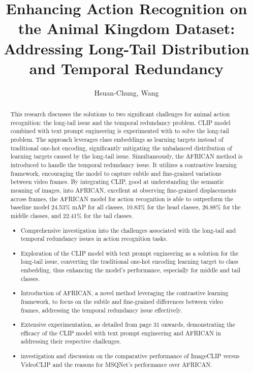 \documentclass[
]{uob-thesis}
\title{Enhancing Action Recognition on the Animal Kingdom Dataset: Addressing Long-Tail Distribution and Temporal Redundancy}
\author{Hsuan-Chung, Wang}
\date{\printdatewithoutmonth{thesisdate}}
\begin{document}

\maketitle
\cleardoubleoddemptypage

\begin{abstract} %

This research discusses the solutions to two significant challenges for animal action recognition: the long-tail issue and the temporal redundancy problem. CLIP model combined with text prompt engineering is experimented with to solve the long-tail problem. The approach leverages class embeddings as learning targets instead of traditional one-hot encoding, significantly mitigating the unbalanced distribution of learning targets caused by the long-tail issue. Simultaneously, the AFRICAN method is introduced to handle the temporal redundancy issue. It utilizes a contrastive learning framework, encouraging the model to capture subtle and fine-grained variations between video frames. By integrating CLIP, good at understanding the semantic meaning of images, into AFRICAN, excellent at observing fine-grained displacements across frames, the AFRICAN model for action recognition is able to outperform the baseline model 24.53\% mAP for all classes, 10.83\% for the head classes, 26.88\% for the middle classes, and 22.41\% for the tail classes.

\begin{itemize}
    \item Comprehensive investigation into the challenges associated with the long-tail and temporal redundancy issues in action recognition tasks.
    \item Exploration of the CLIP model with text prompt engineering as a solution for the long-tail issue, converting the traditional one-hot encoding learning target to class embedding, thus enhancing the model's performance, especially for middle and tail classes.
    \item Introduction of AFRICAN, a novel method leveraging the contrastive learning framework, to focus on the subtle and fine-grained differences between video frames, addressing the temporal redundancy issue effectively.
    \item Extensive experimentation, as detailed from page 31 onwards, demonstrating the efficacy of the CLIP model with text prompt engineering and AFRICAN in addressing their respective challenges.
    \item investigation and discussion on the comparative performance of ImageCLIP versus VideoCLIP and the reasons for MSQNet's performance over AFRICAN.
\end{itemize}
\end{abstract}
\end{document}
